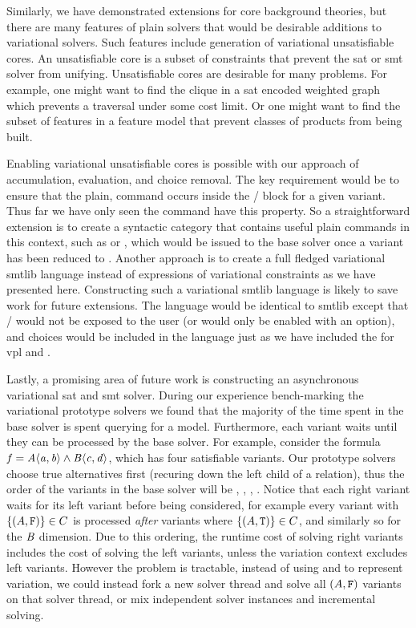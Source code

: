 Similarly, we have demonstrated extensions for core background theories, but
there are many features of plain solvers that would be desirable additions to
variational solvers. Such features include generation of variational
unsatisfiable cores. An unsatisfiable core is a subset of constraints that
prevent the \ac{sat} or \ac{smt} solver from unifying. Unsatisfiable cores are
desirable for many problems. For example, one might want to find the clique in a
\ac{sat} encoded weighted graph which prevents a traversal under some cost
limit. Or one might want to find the subset of features in a feature model that
prevent classes of products from being built.

Enabling variational unsatisfiable cores is possible with our approach of
accumulation, evaluation, and choice removal. The key requirement would be to
ensure that the plain,  command occurs inside the
/ block for a given variant. Thus far we have only seen the
 command have this property. So a straightforward extension is to
create a syntactic category that contains useful plain commands in this context,
such as  or , which would be issued to the base
solver once a variant has been reduced to \unit{}. Another approach is to create
a full fledged variational \acl{smtlib} language instead of expressions of
variational constraints as we have presented here. Constructing such a
variational \acl{smtlib} language is likely to save work for future extensions.
The language would be identical to \acl{smtlib} except that /
would not be exposed to the user (or would only be enabled with an option), and
choices would be included in the language just as we have included the for
\ac{vpl} and \evpl{}.

Lastly, a promising area of future work is constructing an asynchronous
variational \ac{sat} and \ac{smt} solver. During our experience bench-marking
the variational prototype solvers we found that the majority of the time spent
in the base solver is spent querying for a model. Furthermore, each variant
waits until they can be processed by the base solver. For example, consider the
formula $\fV{} = \kf{\chc[A]{a,b} \wedge{} \chc[B]{c,d}}$, which has four
satisfiable variants. Our prototype solvers choose true alternatives first
(recuring down the left child of a relation), thus the order of the variants in
the base solver will be ,
, ,
. Notice that each right variant waits
for its left variant before being considered, for example every variant with
$\set{(A,\fls{})} \in C$ is processed \emph{after} variants where
$\set{(A,\tru{})} \in C$, and similarly so for the $\mathit{B}$ dimension. Due to
this ordering, the runtime cost of solving right variants includes the cost of
solving the left variants, unless the variation context excludes left variants.
However the problem is tractable, instead of using  and  to
represent variation, we could instead fork a new solver thread and solve all
$(A, \texttt{F}{})$ variants on that solver thread, or mix independent solver
instances and incremental solving.

